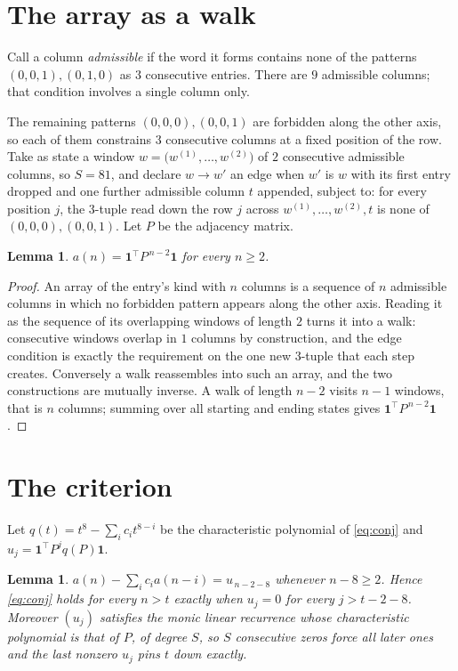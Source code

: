 \documentclass[11pt,a4paper]{article}
\theoremstyle{plain}
\newtheorem{lemma}[theorem]{Lemma}
\theoremstyle{definition}
\begin{document}
\section{The array as a walk}

Call a column \emph{admissible} if the word it forms contains none of the patterns
$(0,0,1), (0,1,0)$ as $3$ consecutive entries. There are $9$ admissible columns; that condition
involves a single column only.

The remaining patterns $(0,0,0), (0,0,1)$ are forbidden along the other axis, so each of them
constrains $3$ consecutive columns at a fixed position of the row. Take as state a
window $w=\bigl(w^{(1)},\dots,w^{(2)}\bigr)$ of $2$ consecutive admissible
columns, so $S=81$, and declare $w\to w'$ an edge when $w'$ is $w$ with its first entry
dropped and one further admissible column $t$ appended, subject to: for every position
$j$, the $3$-tuple read down the row $j$ across $w^{(1)},\dots,w^{(2)},t$
is none of $(0,0,0), (0,0,1)$. Let $P$ be the adjacency matrix.

\begin{lemma}\label{lem:walk}
$a(n)=\mathbf{1}^{\!\top}P^{\,n-2}\mathbf{1}$ for every $n\ge2$.
\end{lemma}

\begin{proof}
An array of the entry's kind with $n$ columns is a sequence of $n$ admissible columns in
which no forbidden pattern appears along the other axis. Reading it as the sequence of its
overlapping windows of length $2$ turns it into a walk: consecutive windows overlap in
$1$ columns by construction, and the edge condition is exactly the requirement on the one
new $3$-tuple that each step creates. Conversely a walk reassembles into such an array,
and the two constructions are mutually inverse. A walk of length $n-2$ visits $n-1$
windows, that is $n$ columns; summing over all starting and ending states gives
$\mathbf{1}^{\!\top}P^{\,n-2}\mathbf{1}$.
\end{proof}

\section{The criterion}

Let $q(t)=t^{8}-\sum_i c_i t^{8-i}$ be the characteristic polynomial of
\eqref{eq:conj} and $u_j=\mathbf{1}^{\!\top}P^{j}q(P)\mathbf{1}$.

\begin{lemma}\label{lem:crit}
$a(n)-\sum_i c_i a(n-i)=u_{\,n-2-8}$ whenever $n-8\ge2$. Hence
\eqref{eq:conj} holds for every $n>t$ exactly when $u_j=0$ for every
$j>t-2-8$. Moreover $(u_j)$ satisfies the monic linear recurrence whose
characteristic polynomial is that of $P$, of degree $S$, so $S$ consecutive zeros force all
later ones and the last nonzero $u_j$ pins $t$ down exactly.
\end{lemma}
\end{document}
